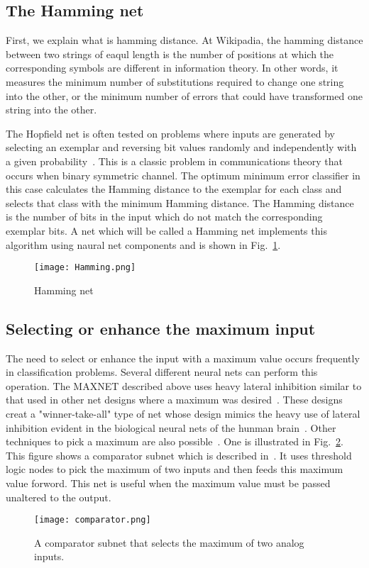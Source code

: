 \documentclass[10pt,twocolumn,letterpaper]{article}
\begin{document}
\subsection{The Hamming net}
\par First, we explain what is hamming distance. At Wikipadia, the hamming distance between two strings of eaqul length is the number of positions at which the corresponding symbols are different in information theory. In other words, it measures the minimum number of substitutions required to change one string into the other, or the minimum number of errors that could have transformed one string into the other.
\par The Hopfield net is often tested on problems where inputs are generated by selecting an exemplar and reversing bit values randomly and independently with a given probability~\cite{hopfield1982neural}. This is a classic problem in communications theory that occurs when binary symmetric channel. The optimum minimum error classifier in this case calculates the Hamming distance to the exemplar for each class and selects that class with the minimum Hamming distance. The Hamming distance is the number of bits in the input which do not match the corresponding exemplar bits. A net which will be called a Hamming net implements this algorithm using naural net components and is shown in Fig.~\ref{Hamming}.
 \begin{figure}[htbp]
 \centering{}
\texttt{[image: Hamming.png]}\\
 \caption{Hamming net}
\label{Hamming}
\end{figure}
\subsection{Selecting or enhance the maximum input}
\par The need to select or enhance the input with a maximum value occurs frequently in classification problems. Several different neural nets can perform this operation. The MAXNET described above uses heavy lateral inhibition similar to that used in other net designs where a maximum was desired~\cite{hopfield1986computing}. These designs creat a "winner-take-all" type of net whose design mimics the heavy use of lateral inhibition evident in the biological neural nets of the hunman brain~\cite{kandel2000principles}. Other techniques to pick a maximum are also possible~\cite{lippmann1987comparison}. One is illustrated in Fig.~\ref{comparator}. This figure shows a comparator subnet which is described in~\cite{martin1970acoustic}. It uses threshold logic nodes to pick the maximum of two inputs and then feeds this maximum value forword. This net is useful when the maximum value must be passed unaltered to the output. 
\begin{figure}[htbp]
 \centering{}
\texttt{[image: comparator.png]}\\
 \caption{A comparator subnet that selects the maximum of two analog inputs.}
\label{comparator}
\end{figure}
 
 
\end{document}
